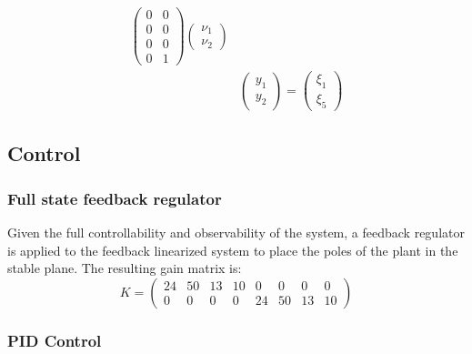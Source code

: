 \begin{frame}
\begin{equation}
\begin{aligned}
\begin{pmatrix}
	 		0 &0 \\
	 		0 &0 \\
	 		0 &0 \\
	 		0 &1
	 	\end{pmatrix}
	 	\begin{pmatrix}
	 		\nu_1 \\ \nu_2
	 	\end{pmatrix}\\[6pt]
	 	&\begin{pmatrix}
	 		y_1\\ y_2
	 	\end{pmatrix}=%
	 	\begin{pmatrix}
	 		\xi_1\\ \xi_5
	 	\end{pmatrix}%
	\end{aligned}
\end{equation}
\end{frame}
%
\subsection{Control}
%
\begin{frame}
\frametitle{Full state feedback regulator}
Given the full controllability and observability of the system, a feedback regulator is applied to the feedback linearized system to place the poles of the plant in the stable plane. The resulting gain matrix is:
\begin{equation}
	K =%
	\begin{pmatrix}
		24 &50 &13 &10 &0 &0 &0 &0 \\
		0 &0 &0 &0 &24 &50 &13 &10
	\end{pmatrix}
\end{equation}
\end{frame}
\begin{frame}
\frametitle{PID Control}
\end{frame}